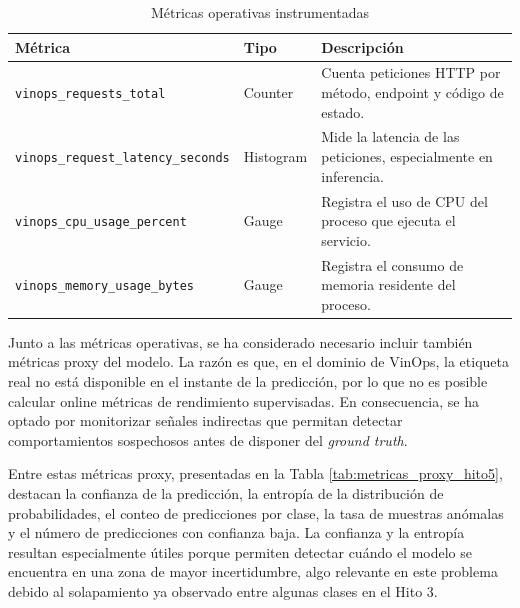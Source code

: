 \begin{table}[h]
\centering
\caption{Métricas operativas instrumentadas}
\vspace{0.2cm}
\begin{tabular}{l l p{7.5cm}}
\hline
\textbf{Métrica} & \textbf{Tipo} & \textbf{Descripción} \\
\hline
\texttt{vinops\_requests\_total} & Counter & Cuenta peticiones HTTP por método, endpoint y código de estado. \\
\texttt{vinops\_request\_latency\_seconds} & Histogram & Mide la latencia de las peticiones, especialmente en inferencia. \\
\texttt{vinops\_cpu\_usage\_percent} & Gauge & Registra el uso de CPU del proceso que ejecuta el servicio. \\
\texttt{vinops\_memory\_usage\_bytes} & Gauge & Registra el consumo de memoria residente del proceso. \\
\hline
\end{tabular}
\label{tab:metricas_operativas_hito5}
\end{table}

Junto a las métricas operativas, se ha considerado necesario incluir también métricas proxy del modelo. La razón es que, en el dominio de VinOps, la etiqueta real no está disponible en el instante de la predicción, por lo que no es posible calcular online métricas de rendimiento supervisadas. En consecuencia, se ha optado por monitorizar señales indirectas que permitan detectar comportamientos sospechosos antes de disponer del \textit{ground truth}.

Entre estas métricas proxy, presentadas en la Tabla \ref{tab:metricas_proxy_hito5}, destacan la confianza de la predicción, la entropía de la distribución de probabilidades, el conteo de predicciones por clase, la tasa de muestras anómalas y el número de predicciones con confianza baja. La confianza y la entropía resultan especialmente útiles porque permiten detectar cuándo el modelo se encuentra en una zona de mayor incertidumbre, algo relevante en este problema debido al solapamiento ya observado entre algunas clases en el Hito 3. 

